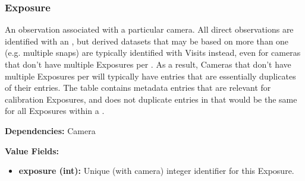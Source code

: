 \subsubsection{Exposure}
\label{unit:Exposure}

An observation associated with a particular camera.  All direct
observations are identified with an , but derived
datasets that may be based on more than one  (e.g.
multiple snaps) are typically identified with Visits instead, even for
cameras that don't have multiple Exposures per .  As a
result, Cameras that don't have multiple Exposures per 
will typically have  entries that are essentially
duplicates of their  entries. The 
table contains metadata entries that are relevant for calibration
Exposures, and does not duplicate entries in  that
would be the same for all Exposures within a .

\textbf{Dependencies:} Camera

\textbf{Value Fields:}
\begin{itemize}
  \item \textbf{exposure (int):}
      Unique (with camera) integer identifier for this Exposure.
\end{itemize}

